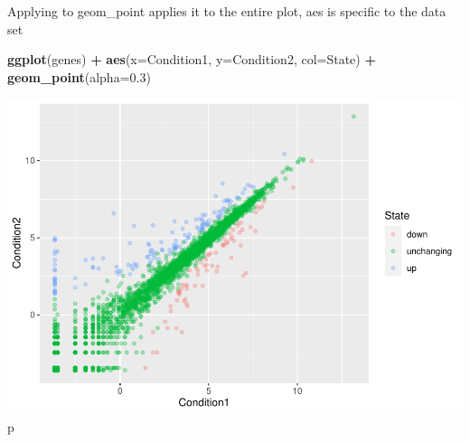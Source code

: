 \documentclass[
]{article}
\newenvironment{Shaded}{\begin{snugshade}}{\end{snugshade}}
\newcommand{\DataTypeTok}[1]{\textcolor[rgb]{0.13,0.29,0.53}{#1}}
\newcommand{\FloatTok}[1]{\textcolor[rgb]{0.00,0.00,0.81}{#1}}
\newcommand{\KeywordTok}[1]{\textcolor[rgb]{0.13,0.29,0.53}{\textbf{#1}}}
\newcommand{\NormalTok}[1]{#1}
\newcommand{\OperatorTok}[1]{\textcolor[rgb]{0.81,0.36,0.00}{\textbf{#1}}}
\newcommand{\StringTok}[1]{\textcolor[rgb]{0.31,0.60,0.02}{#1}}
\begin{document}
Applying to geom\_point applies it to the entire plot, aes is specific
to the data set

\begin{Shaded}
\begin{Highlighting}[]
 \KeywordTok{ggplot}\NormalTok{(genes) }\OperatorTok{+}\StringTok{ }
\StringTok{    }\KeywordTok{aes}\NormalTok{(}\DataTypeTok{x=}\NormalTok{Condition1, }\DataTypeTok{y=}\NormalTok{Condition2, }\DataTypeTok{col=}\NormalTok{State) }\OperatorTok{+}
\StringTok{    }\KeywordTok{geom_point}\NormalTok{(}\DataTypeTok{alpha=}\FloatTok{0.3}\NormalTok{)}
\end{Highlighting}
\end{Shaded}

\includegraphics{class05_files/figure-latex/unnamed-chunk-14-1.pdf} p
\end{document}
